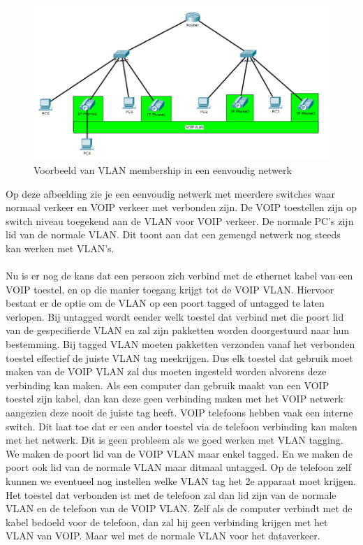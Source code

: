 \documentclass[pdftex,a4paper,12pt,twoside]{report}
\begin{document}
\begin{figure}[H]

\caption{Voorbeeld van VLAN membership in een eenvoudig netwerk \protect \footnotemark}
\includegraphics[scale=0.7]{img/VLAN}
\end{figure}

Op deze afbeelding zie je een eenvoudig netwerk met meerdere switches waar normaal verkeer en VOIP verkeer met verbonden zijn. De VOIP toestellen zijn op switch niveau toegekend aan de VLAN voor VOIP verkeer. De normale PC's zijn lid van de normale VLAN. Dit toont aan dat een gemengd netwerk nog steeds kan werken met VLAN's.
\\
\\
Nu is er nog de kans dat een persoon zich verbind met de ethernet kabel van een VOIP toestel, en op die manier toegang krijgt tot de VOIP VLAN. Hiervoor bestaat er de optie om de VLAN op een poort tagged of untagged te laten verlopen. Bij untagged wordt eender welk toestel dat verbind met die poort lid van de gespecifierde VLAN en zal zijn pakketten worden doorgestuurd naar hun bestemming. Bij tagged VLAN moeten pakketten verzonden vanaf het verbonden toestel effectief de juiste VLAN tag meekrijgen. Dus elk toestel dat gebruik moet maken van de VOIP VLAN zal dus moeten ingesteld worden alvorens deze verbinding kan maken. Als een computer dan gebruik maakt van een VOIP toestel zijn kabel, dan kan deze geen verbinding maken met het VOIP netwerk aangezien deze nooit de juiste tag heeft. \newpage
VOIP telefoons hebben vaak een interne switch. Dit laat toe dat er een ander toestel via de telefoon verbinding kan maken met het netwerk. Dit is geen probleem als we goed werken met VLAN tagging. We maken de poort lid van de VOIP VLAN maar enkel tagged. En we maken de poort ook lid van de normale VLAN maar ditmaal untagged. Op de telefoon zelf kunnen we eventueel nog instellen welke VLAN tag het 2e apparaat moet krijgen. Het toestel dat verbonden ist met de telefoon zal dan lid zijn van de normale VLAN en de telefoon van de VOIP VLAN. Zelf als de computer verbindt met de kabel bedoeld voor de telefoon, dan zal hij geen verbinding krijgen met het VLAN van VOIP. Maar wel met de normale VLAN voor het dataverkeer. 
\end{document}
